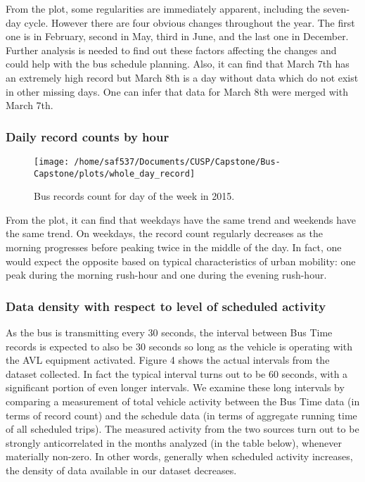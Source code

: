 \documentclass[12pt]{report}
\begin{document}
From the plot, some regularities are immediately apparent, including the seven-day cycle. However there are four obvious changes throughout the year. The first one is in February, second in May, third in June, and the last one in December. Further analysis is needed to find out these factors affecting the changes and could help with the bus schedule planning. Also, it can find that March 7th has an extremely high record but March 8th is a day without data which do not exist in other missing days. One can infer that data for March 8th were merged with March 7th.
      
      \subsubsection*{Daily record counts by hour}
      

\begin{figure}[!ht]
	\label{week}
  \caption{Bus records count for day of the week in 2015.}
  \centering
    \texttt{[image: /home/saf537/Documents/CUSP/Capstone/Bus-Capstone/plots/whole\_day\_record]}
\end{figure}

From the plot, it can find that weekdays have the same trend and weekends have the same trend.   On weekdays, the record count regularly decreases as the morning progresses before peaking twice in the middle of the day.  In fact, one would expect the opposite based on typical characteristics of urban mobility: one peak during the morning rush-hour and one during the evening rush-hour.


      \subsubsection*{Data density with respect to level of scheduled activity}
      
       
   As the bus is transmitting every 30 seconds, the interval between Bus Time records is expected to also be 30 seconds so long as the vehicle is operating with the AVL equipment activated.  Figure 4 shows the actual intervals from the dataset collected.  In fact the typical interval turns out to be 60 seconds, with a significant portion of even longer intervals.  We examine these long intervals by comparing a measurement of total vehicle activity between the Bus Time data (in terms of record count) and the schedule data (in terms of aggregate running time of all scheduled trips). The measured activity from the two sources turn out to be strongly anticorrelated in the months analyzed (in the table below), whenever materially non-zero.  In other words, generally when scheduled activity increases, the density of data available in our dataset decreases.
\end{document}
